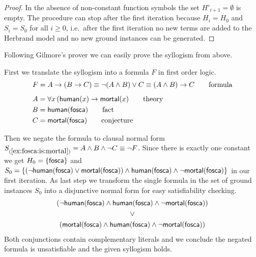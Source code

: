 \begin{proof}
	In the absence of non-constant function symbols the set \( H'_{i+1} = \emptyset \) is empty.
	The procedure can stop after the first iteration because
	\( H_i = H_0 \) and \( S_i = S_0 \) for all \( i\geq0 \),
	i.e.~after the first iteration
	no new terms are added to the Herbrand model
	and no new ground instances can be generated.
\end{proof}

Following Gilmore's prover we can easily prove the syllogism from above.

\begin{example}\label{ex:fosca:is:mortal}
	First we translate the syllogism into a formula \( F \) in first order logic.
	\begin{align*}
	F &= A \rightarrow (B \rightarrow C) \equiv \lnot(A\land B) \lor C \equiv (A\land B)\rightarrow C
	\tag*{formula}
	\\[0.5em]
	A &= \forall x \, ( \mathsf{human}(x) \rightarrow \mathsf{mortal}(x)
	\tag*{theory}
	\\
	B &= \mathsf{human}(\mathsf{fosca})
	\tag*{fact}
	\\
	C &= \mathsf{mortal}(\mathsf{fosca})
	\tag*{conjecture}
	\end{align*}



	Then we negate the formula to clausal normal form \( S_{(\ref{ex:fosca:is:mortal})} = A\land B \land\lnot C \equiv \lnot F \).
	Since there is exactly one constant we get
	\( H_0 = \{ \mathsf{fosca} \} \) and
	\( S_0 =
	 \{
	(\lnot\mathsf{human}(\mathsf{fosca})\lor\mathsf{mortal}(\mathsf{fosca}))\land\mathsf{human}(\mathsf{fosca})\land\lnot\mathsf{mortal}(\mathsf{fosca})
	\} \) in our first iteration.
	As last step we transform the single formula in
	the set of ground instances \( S_0 \) into a disjunctive normal form
	for easy satisfiability checking.
	\begin{gather*}
	(\lnot\mathsf{human}(\mathsf{fosca})\land\mathsf{human}(\mathsf{fosca})\land\lnot\mathsf{mortal}(\mathsf{fosca}))
	\\
	\lor
	\\
	(\mathsf{mortal}(\mathsf{fosca})\land\mathsf{human}(\mathsf{fosca})\land\lnot\mathsf{mortal}(\mathsf{fosca}))
	\end{gather*}
	Both conjunctions contain complementary literals and we conclude the negated formula is unsatisfiable
	and the given syllogism holds.

\end{example}

